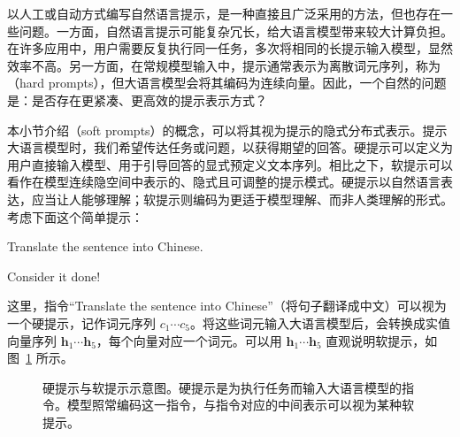 \noindent 以人工或自动方式编写自然语言提示，是一种直接且广泛采用的方法，但也存在一些问题。一方面，自然语言提示可能复杂冗长，给大语言模型带来较大计算负担。在许多应用中，用户需要反复执行同一任务，多次将相同的长提示输入模型，显然效率不高。另一方面，在常规模型输入中，提示通常表示为离散词元序列，称为（hard prompts），但大语言模型会将其编码为连续向量。因此，一个自然的问题是：是否存在更紧凑、更高效的提示表示方式？

本小节介绍（soft prompts）的概念，可以将其视为提示的隐式分布式表示。提示大语言模型时，我们希望传达任务或问题，以获得期望的回答。硬提示可以定义为用户直接输入模型、用于引导回答的显式预定义文本序列。相比之下，软提示可以看作在模型连续隐空间中表示的、隐式且可调整的提示模式。硬提示以自然语言表达，应当让人能够理解；软提示则编码为更适于模型理解、而非人类理解的形式。考虑下面这个简单提示：

\vspace{0.5em}
\begin{tcolorbox}

\begingroup
\setlength{\leftskip}{2em}
\setlength{\rightskip}{2em}

Translate the sentence into Chinese.

\vspace{0.5em}

Consider it done!

\vspace{0.5em}

\underline{\hspace{2em}}

\endgroup

\end{tcolorbox}
\vspace{0.5em}

\noindent 这里，指令“Translate the sentence into Chinese”（将句子翻译成中文）可以视为一个硬提示，记作词元序列 $c_1 \cdots c_5$。将这些词元输入大语言模型后，会转换成实值向量序列 $\mathbf{h}_1 \cdots \mathbf{h}_5$，每个向量对应一个词元。可以用 $\mathbf{h}_1 \cdots \mathbf{h}_5$ 直观说明软提示，如图~\ref{fig:hard-and-soft-prompt-examples} 所示。

\begin{figure}[!t]
\centering

\caption{硬提示与软提示示意图。硬提示是为执行任务而输入大语言模型的指令。模型照常编码这一指令，与指令对应的中间表示可以视为某种软提示。}
\label{fig:hard-and-soft-prompt-examples}
\end{figure}

